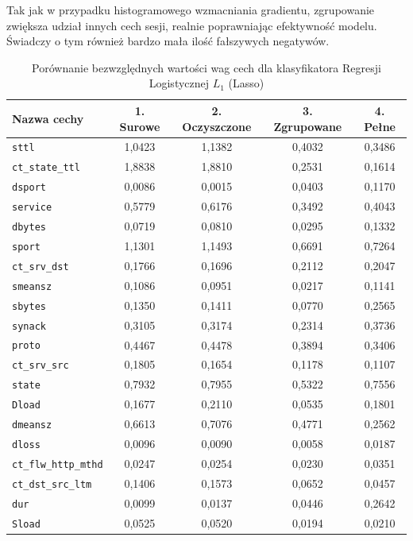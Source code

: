 \documentclass[12pt,twoside]{article}
\begin{document}
Tak jak w przypadku histogramowego wzmacniania gradientu, zgrupowanie zwiększa udział innych cech sesji, realnie poprawniając efektywność modelu.
Świadczy o tym również bardzo mała ilość fałszywych negatywów.

\begin{table}[htbp]
\caption{Porównanie bezwzględnych wartości wag cech dla klasyfikatora Regresji Logistycznej $L_1$ (Lasso)}
\centering
\begin{tabular}{|l|c|c|c|c|}
\hline
\textbf{Nazwa cechy} & \textbf{1. Surowe} & \textbf{2. Oczyszczone} & \textbf{3. Zgrupowane} & \textbf{4. Pełne} \\
\hline
\texttt{sttl} & 1,0423 & 1,1382 & 0,4032 & 0,3486 \\
\texttt{ct\_state\_ttl} & 1,8838 & 1,8810 & 0,2531 & 0,1614 \\
\texttt{dsport} & 0,0086 & 0,0015 & 0,0403 & 0,1170 \\
\texttt{service} & 0,5779 & 0,6176 & 0,3492 & 0,4043 \\
\texttt{dbytes} & 0,0719 & 0,0810 & 0,0295 & 0,1332 \\
\texttt{sport} & 1,1301 & 1,1493 & 0,6691 & 0,7264 \\
\texttt{ct\_srv\_dst} & 0,1766 & 0,1696 & 0,2112 & 0,2047 \\
\texttt{smeansz} & 0,1086 & 0,0951 & 0,0217 & 0,1141 \\
\texttt{sbytes} & 0,1350 & 0,1411 & 0,0770 & 0,2565 \\
\texttt{synack} & 0,3105 & 0,3174 & 0,2314 & 0,3736 \\
\texttt{proto} & 0,4467 & 0,4478 & 0,3894 & 0,3406 \\
\texttt{ct\_srv\_src} & 0,1805 & 0,1654 & 0,1178 & 0,1107 \\
\texttt{state} & 0,7932 & 0,7955 & 0,5322 & 0,7556 \\
\texttt{Dload} & 0,1677 & 0,2110 & 0,0535 & 0,1801 \\
\texttt{dmeansz} & 0,6613 & 0,7076 & 0,4771 & 0,2562 \\
\texttt{dloss} & 0,0096 & 0,0090 & 0,0058 & 0,0187 \\
\texttt{ct\_flw\_http\_mthd} & 0,0247 & 0,0254 & 0,0230 & 0,0351 \\
\texttt{ct\_dst\_src\_ltm} & 0,1406 & 0,1573 & 0,0652 & 0,0457 \\
\texttt{dur} & 0,0099 & 0,0137 & 0,0446 & 0,2642 \\
\texttt{Sload} & 0,0525 & 0,0520 & 0,0194 & 0,0210 \\

\end{tabular}
\end{table}
\end{document}
